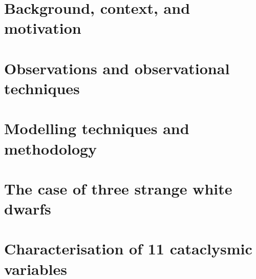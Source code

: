\documentclass[a4paper,12pt,oneside,openright]{report}
\begin{document}


\begin{onehalfspace}                                         


\chapter{Background, context, and motivation}


\chapter{Observations and observational techniques}


\chapter{Modelling techniques and methodology}


\chapter{The case of three strange white dwarfs}


\chapter{Characterisation of 11 cataclysmic variables}


\end{onehalfspace}

\begin{singlespace}


 

\end{singlespace}  

\onehalfspacing
\appendix
\clearpage
\end{document}

